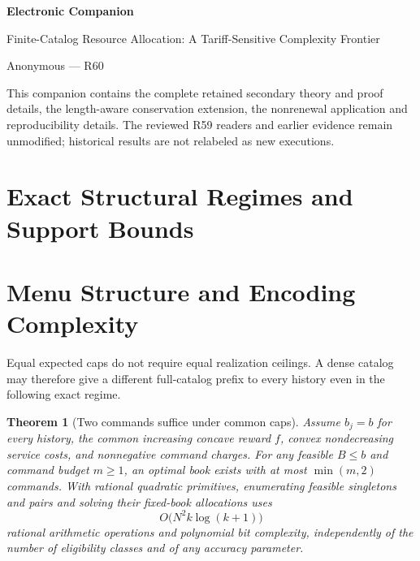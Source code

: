 \documentclass[11pt,letterpaper]{article}
\newtheorem{theorem}{Theorem}[section]
\theoremstyle{definition}\newtheorem{remark}[theorem]{Remark}
\begin{document}
\begin{center}{\Large\bfseries Electronic Companion}\par Finite-Catalog Resource Allocation: A Tariff-Sensitive Complexity Frontier\par Anonymous --- R60\end{center}
This companion contains the complete retained secondary theory and proof details, the length-aware conservation extension, the nonrenewal application and reproducibility details. The reviewed R59 readers and earlier evidence remain unmodified; historical results are not relabeled as new executions.
\section{Exact Structural Regimes and Support Bounds}
\section{Menu Structure and Encoding Complexity}\label{sec:caps54}
Equal expected caps do not require equal realization ceilings. A dense catalog may therefore give a different full-catalog prefix to every history even in the following exact regime.
\begin{theorem}[Two commands suffice under common caps]\label{thm:twocommand54}
Assume $b_j=b$ for every history, the common increasing concave reward $f$, convex nondecreasing service costs, and nonnegative command charges. For any feasible $B\leq b$ and command budget $m\geq1$, an optimal book exists with at most $\min(m,2)$ commands. With rational quadratic primitives, enumerating feasible singletons and pairs and solving their fixed-book allocations uses
\[
 O\bigl(N^2k\log(k+1)\bigr)
\]
rational arithmetic operations and polynomial bit complexity, independently of the number of eligibility classes and of any accuracy parameter.
\end{theorem}
\end{document}
